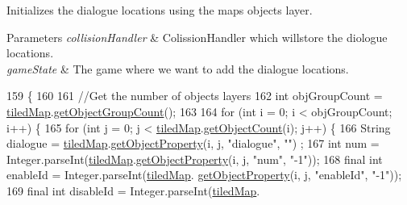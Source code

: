 Initializes the dialogue locations using the map\textquotesingle{}s objects layer.


\begin{DoxyParams}{Parameters}
{\em collision\+Handler} & Colission\+Handler which willstore the diologue locations. \\
\hline
{\em game\+State} & The game where we want to add the dialogue locations. \\
\hline
\end{DoxyParams}

\begin{DoxyCode}
159                                                                                                     \{
160 
161         \textcolor{comment}{//Get the number of objects layers}
162         \textcolor{keywordtype}{int} objGroupCount = \mbox{\hyperlink{classentities_1_1_map_a94a743ccd80946422fcbdb5ba1cc966b}{tiledMap}}.\mbox{\hyperlink{classorg_1_1newdawn_1_1slick_1_1tiled_1_1_tiled_map_aa39650c84fe749bbe63ee1f65a80df20}{getObjectGroupCount}}();
163 
164         \textcolor{keywordflow}{for} (\textcolor{keywordtype}{int} i = 0; i < objGroupCount; i++) \{
165             \textcolor{keywordflow}{for} (\textcolor{keywordtype}{int} j = 0; j < \mbox{\hyperlink{classentities_1_1_map_a94a743ccd80946422fcbdb5ba1cc966b}{tiledMap}}.\mbox{\hyperlink{classorg_1_1newdawn_1_1slick_1_1tiled_1_1_tiled_map_a445ccc51d54dfa01c589de1c957cce0c}{getObjectCount}}(i); j++) \{
166                 String dialogue = \mbox{\hyperlink{classentities_1_1_map_a94a743ccd80946422fcbdb5ba1cc966b}{tiledMap}}.\mbox{\hyperlink{classorg_1_1newdawn_1_1slick_1_1tiled_1_1_tiled_map_ac73d3772b22f8fc9e200b9f3db40116c}{getObjectProperty}}(i, j, \textcolor{stringliteral}{"dialogue"}, \textcolor{stringliteral}{""})
      ;
167                 \textcolor{keywordtype}{int} num = Integer.parseInt(\mbox{\hyperlink{classentities_1_1_map_a94a743ccd80946422fcbdb5ba1cc966b}{tiledMap}}.\mbox{\hyperlink{classorg_1_1newdawn_1_1slick_1_1tiled_1_1_tiled_map_ac73d3772b22f8fc9e200b9f3db40116c}{getObjectProperty}}(i, j, \textcolor{stringliteral}{"num"},
       \textcolor{stringliteral}{"-1"}));
168                 \textcolor{keyword}{final} \textcolor{keywordtype}{int} enableId = Integer.parseInt(\mbox{\hyperlink{classentities_1_1_map_a94a743ccd80946422fcbdb5ba1cc966b}{tiledMap}}.
      \mbox{\hyperlink{classorg_1_1newdawn_1_1slick_1_1tiled_1_1_tiled_map_ac73d3772b22f8fc9e200b9f3db40116c}{getObjectProperty}}(i, j, \textcolor{stringliteral}{"enableId"}, \textcolor{stringliteral}{"-1"}));
169                 \textcolor{keyword}{final} \textcolor{keywordtype}{int} disableId = Integer.parseInt(\mbox{\hyperlink{classentities_1_1_map_a94a743ccd80946422fcbdb5ba1cc966b}{tiledMap}}.

\end{DoxyCode}
